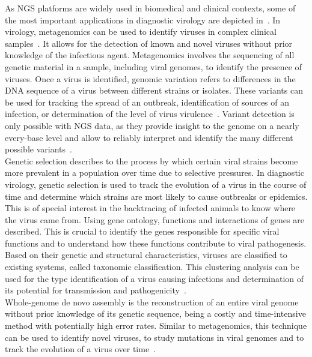 As \ac{NGS} platforms are widely used in biomedical and clinical contexts, some of the most important applications in diagnostic virology are depicted in~. In virology, metagenomics can be used to identify viruses in complex clinical samples~\cite{chiu2019clinical}. It allows for the detection of known and novel viruses without prior knowledge of the infectious agent. Metagenomics involves the sequencing of all genetic material in a sample, including viral genomes, to identify the presence of viruses. Once a virus is identified, genomic variation refers to differences in the \ac{DNA} sequence of a virus between different strains or isolates. These variants can be used for tracking the spread of an outbreak, identification of sources of an infection, or determination of the level of virus virulence~\cite{capobianchi2013next}. Variant detection is only possible with \ac{NGS} data, as they provide insight to the genome on a nearly every-base level and allow to reliably interpret and identify the many different possible variants~\cite{koboldt2013next}. \\ 
Genetic selection describes to the process by which certain viral strains become more prevalent in a population over time due to selective pressures. In diagnostic virology, genetic selection is used to track the evolution of a virus in the course of time and determine which strains are most likely to cause outbreaks or epidemics. This is of special interest in the backtracing of infected animals to know where the virus came from. Using gene ontology, functions and interactions of genes are described. This is crucial to identify the genes responsible for specific viral functions and to understand how these functions contribute to viral pathogenesis. \\
Based on their genetic and structural characteristics, viruses are classified to existing systems, called taxonomic classification. This clustering analysis can be used for the type identification of a virus causing infections and determination of its potential for transmission and pathogenicity~\cite{dutilh2021perspective}.\\
Whole-genome de novo assembly is the reconstruction of an entire viral genome without prior knowledge of its genetic sequence, being a costly and time-intensive method with potentially high error rates. Similar to metagenomics, this technique can be used to identify novel viruses, to study mutations in viral genomes and to track the evolution of a virus over time~\cite{slatko2018overview}.


